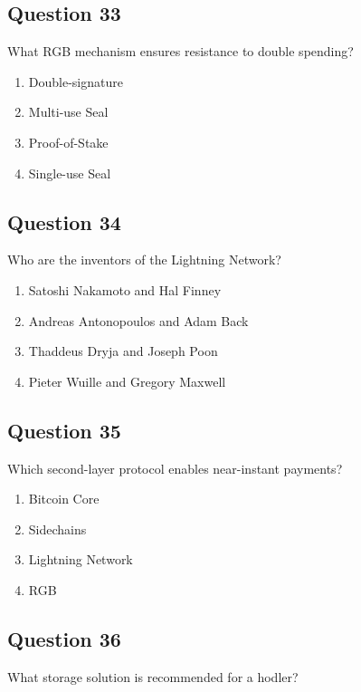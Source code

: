 \documentclass[12pt,a4paper]{article}
\begin{document}
\bigskip


\subsection*{Question 33}
What RGB mechanism ensures resistance to double spending?

\begin{enumerate}[label=\Alph*., leftmargin=*]
\item Double-signature
\item Multi-use Seal
\item Proof-of-Stake
\item Single-use Seal
\end{enumerate}

\bigskip


\subsection*{Question 34}
Who are the inventors of the Lightning Network?

\begin{enumerate}[label=\Alph*., leftmargin=*]
\item Satoshi Nakamoto and Hal Finney
\item Andreas Antonopoulos and Adam Back
\item Thaddeus Dryja and Joseph Poon
\item Pieter Wuille and Gregory Maxwell
\end{enumerate}

\bigskip


\subsection*{Question 35}
Which second-layer protocol enables near-instant payments?

\begin{enumerate}[label=\Alph*., leftmargin=*]
\item Bitcoin Core
\item Sidechains
\item Lightning Network
\item RGB
\end{enumerate}

\bigskip


\subsection*{Question 36}
What storage solution is recommended for a hodler?
\end{document}
